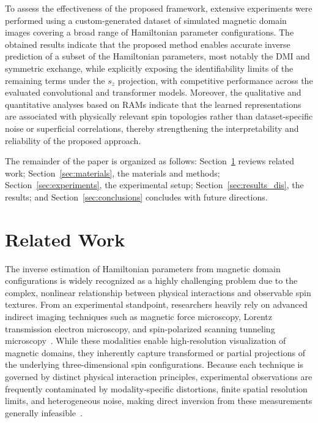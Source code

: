 \documentclass[final,5p,times,twocolumn]{elsarticle}
\begin{document}
To assess the effectiveness of the proposed framework, extensive experiments were performed using a custom-generated dataset of simulated magnetic domain images covering a broad range of Hamiltonian parameter configurations. The obtained results indicate that the proposed method enables accurate inverse prediction of a subset of the Hamiltonian parameters, most notably the DMI and symmetric exchange, while explicitly exposing the identifiability limits of the remaining terms under the $s_z$ projection, with competitive performance across the evaluated convolutional and transformer models. Moreover, the qualitative and quantitative analyses based on RAMs indicate that the learned representations are associated with physically relevant spin topologies rather than dataset-specific noise or superficial correlations, thereby strengthening the interpretability and reliability of the proposed approach. 

The remainder of the paper is organized as follows: Section~\ref{sec:related} reviews related work; Section~\ref{sec:materials}, the materials and methods; Section~\ref{sec:experiments}, the experimental setup; Section~\ref{sec:results_dis}, the results; and Section~\ref{sec:conclusions} concludes with future directions.

\section{Related Work}\label{sec:related}

The inverse estimation of Hamiltonian parameters from magnetic domain configurations is widely recognized as a highly challenging problem due to the complex, nonlinear relationship between physical interactions and observable spin textures. From an experimental standpoint, researchers heavily rely on advanced indirect imaging techniques such as magnetic force microscopy, Lorentz transmission electron microscopy, and spin-polarized scanning tunneling microscopy~\cite{nguyen2022cooperative}. While these modalities enable high-resolution visualization of magnetic domains, they inherently capture transformed or partial projections of the underlying three-dimensional spin configurations. Because each technique is governed by distinct physical interaction principles, experimental observations are frequently contaminated by modality-specific distortions, finite spatial resolution limits, and heterogeneous noise, making direct inversion from these measurements generally infeasible~\cite{zhao2025overview, gaida2023lorentz}. 
\end{document}
